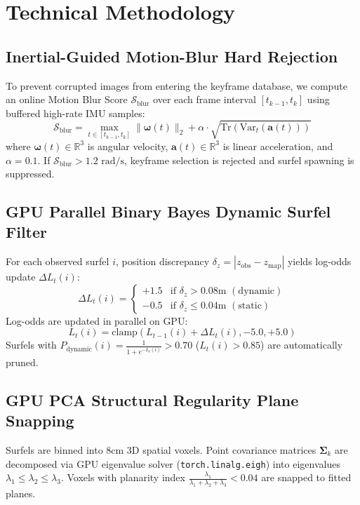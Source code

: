 \documentclass[letterpaper, 10 pt, conference]{ieeeconf}
\begin{document}
\section{Technical Methodology}

\subsection{Inertial-Guided Motion-Blur Hard Rejection}
To prevent corrupted images from entering the keyframe database, we compute an online Motion Blur Score $\mathcal{S}_{\text{blur}}$ over each frame interval $[t_{k-1}, t_k]$ using buffered high-rate IMU samples:
\begin{equation}
\mathcal{S}_{\text{blur}} = \max_{t \in [t_{k-1}, t_k]} \|\mathbf{\omega}(t)\|_2 + \alpha \cdot \sqrt{\text{Tr}\left(\text{Var}_{t}(\mathbf{a}(t))\right)}
\end{equation}
where $\mathbf{\omega}(t) \in \mathbb{R}^3$ is angular velocity, $\mathbf{a}(t) \in \mathbb{R}^3$ is linear acceleration, and $\alpha = 0.1$. If $\mathcal{S}_{\text{blur}} > 1.2\text{ rad/s}$, keyframe selection is rejected and surfel spawning is suppressed.

\subsection{GPU Parallel Binary Bayes Dynamic Surfel Filter}
For each observed surfel $i$, position discrepancy $\delta_z = |z_{\text{obs}} - z_{\text{map}}|$ yields log-odds update $\Delta L_t(i)$:
\begin{equation}
\Delta L_t(i) = \begin{cases} +1.5 & \text{if } \delta_z > 0.08\text{m } (\text{dynamic}) \\ -0.5 & \text{if } \delta_z \le 0.04\text{m } (\text{static}) \end{cases}
\end{equation}
Log-odds are updated in parallel on GPU:
\begin{equation}
L_t(i) = \text{clamp}\left(L_{t-1}(i) + \Delta L_t(i), -5.0, +5.0\right)
\end{equation}
Surfels with $P_{\text{dynamic}}(i) = \frac{1}{1 + e^{-L_t(i)}} > 0.70$ ($L_t(i) > 0.85$) are automatically pruned.

\subsection{GPU PCA Structural Regularity Plane Snapping}
Surfels are binned into $8\text{cm}$ 3D spatial voxels. Point covariance matrices $\mathbf{\Sigma}_k$ are decomposed via GPU eigenvalue solver (\texttt{torch.linalg.eigh}) into eigenvalues $\lambda_1 \le \lambda_2 \le \lambda_3$. Voxels with planarity index $\frac{\lambda_1}{\lambda_1 + \lambda_2 + \lambda_3} < 0.04$ are snapped to fitted planes.
\end{document}
